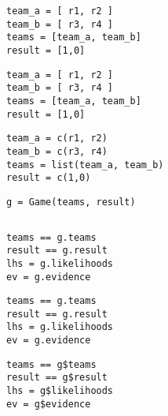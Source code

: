 \documentclass[article]{jss}
\newif\ifen
\newif\ifes
\newcommand{\en}[1]{\ifen#1\fi}
\newcommand{\es}[1]{\ifes#1\fi}
\begin{document}
\en{The class \texttt{Game()} is used to compute the posteriors and the evidence of events such as described in Figure~\ref{fig:generative_model}.}
\es{La clase \texttt{Game()} se utiliza para computar los posteriors y la evidencia de eventos como los descritos en la figura~\ref{fig:generative_model}.}
%
\en{As an example, we initialize a game with two teams of two players.}
\es{A modo de ejemplo, inicializamos una partida con dos equipos de dos jugadores.}
%
\begin{lstlisting}[backgroundcolor=\color{white},label=lst:game, caption=\relax, belowskip=-1.0 \baselineskip, aboveskip=-0 \baselineskip]
\end{lstlisting}
\begin{paracol}{3}
\begin{lstlisting}[backgroundcolor=\color{julia}, belowskip=-0.77 \baselineskip]
team_a = [ r1, r2 ]
team_b = [ r3, r4 ]
teams = [team_a, team_b]
result = [1,0]
\end{lstlisting}
  \switchcolumn
\begin{lstlisting}[backgroundcolor=\color{python}, belowskip=-0.77 \baselineskip]
team_a = [ r1, r2 ]
team_b = [ r3, r4 ]
teams = [team_a, team_b]
result = [1,0]
\end{lstlisting}
   \switchcolumn
\begin{lstlisting}[backgroundcolor=\color{r}, belowskip=-0.77 \baselineskip]
team_a = c(r1, r2)
team_b = c(r3, r4)
teams = list(team_a, team_b)
result = c(1,0)
\end{lstlisting}  
\end{paracol}
\begin{lstlisting}[backgroundcolor=\color{all}]
g = Game(teams, result)
\end{lstlisting}
%
\en{Its attributes, besides the \texttt{teams} and the \texttt{result}, are the approximate (Gaussian) \texttt{likelihoods} and the \texttt{evidence}.}
\es{Sus atributos, además de los \texttt{teams} y el \texttt{result}, son los \texttt{likelihoods} aproximados (Gaussianos) y la \texttt{evidencia}.}
%
\begin{lstlisting}[backgroundcolor=\color{white},label=lst:game_attributes, caption=\relax, belowskip=-1.0 \baselineskip, aboveskip=-0 \baselineskip]
\end{lstlisting}
\begin{paracol}{3}
\begin{lstlisting}[backgroundcolor=\color{julia}]
teams == g.teams
result == g.result
lhs = g.likelihoods
ev = g.evidence
\end{lstlisting}
  \switchcolumn
\begin{lstlisting}[backgroundcolor=\color{python}]
teams == g.teams
result == g.result
lhs = g.likelihoods
ev = g.evidence
\end{lstlisting}
   \switchcolumn
\begin{lstlisting}[backgroundcolor=\color{r}]
teams == g$teams
result == g$result
lhs = g$likelihoods
ev = g$evidence
\end{lstlisting}  
\end{paracol}
\end{document}
